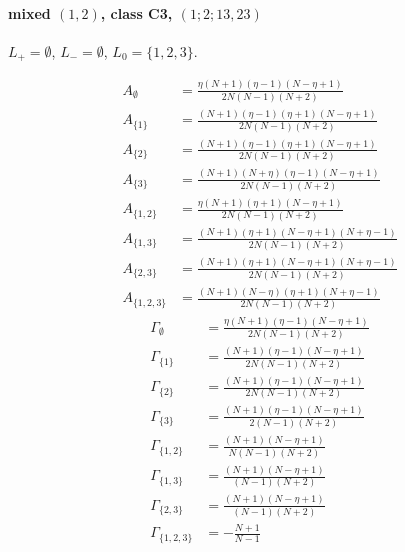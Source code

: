 \documentclass[11pt]{article}
\begin{document}
\paragraph{mixed $(1,2)$, class C3, $(1;2;13,23)$}

$L_+=\emptyset$, $L_-=\emptyset$, $L_0=\{1,2,3\}$.

\begin{align*}
  A_{\emptyset} &= \frac{\eta \left(N + 1\right) \left(\eta - 1\right) \left(N - \eta + 1\right)}{2 N \left(N - 1\right) \left(N + 2\right)} \\
  A_{\{1\}} &= \frac{\left(N + 1\right) \left(\eta - 1\right) \left(\eta + 1\right) \left(N - \eta + 1\right)}{2 N \left(N - 1\right) \left(N + 2\right)} \\
  A_{\{2\}} &= \frac{\left(N + 1\right) \left(\eta - 1\right) \left(\eta + 1\right) \left(N - \eta + 1\right)}{2 N \left(N - 1\right) \left(N + 2\right)} \\
  A_{\{3\}} &= \frac{\left(N + 1\right) \left(N + \eta\right) \left(\eta - 1\right) \left(N - \eta + 1\right)}{2 N \left(N - 1\right) \left(N + 2\right)} \\
  A_{\{1,2\}} &= \frac{\eta \left(N + 1\right) \left(\eta + 1\right) \left(N - \eta + 1\right)}{2 N \left(N - 1\right) \left(N + 2\right)} \\
  A_{\{1,3\}} &= \frac{\left(N + 1\right) \left(\eta + 1\right) \left(N - \eta + 1\right) \left(N + \eta - 1\right)}{2 N \left(N - 1\right) \left(N + 2\right)} \\
  A_{\{2,3\}} &= \frac{\left(N + 1\right) \left(\eta + 1\right) \left(N - \eta + 1\right) \left(N + \eta - 1\right)}{2 N \left(N - 1\right) \left(N + 2\right)} \\
  A_{\{1,2,3\}} &= \frac{\left(N + 1\right) \left(N - \eta\right) \left(\eta + 1\right) \left(N + \eta - 1\right)}{2 N \left(N - 1\right) \left(N + 2\right)} 
\end{align*}
\begin{align*}
  \Gamma_{\emptyset} &= \frac{\eta \left(N + 1\right) \left(\eta - 1\right) \left(N - \eta + 1\right)}{2 N \left(N - 1\right) \left(N + 2\right)} \\
  \Gamma_{\{1\}} &= \frac{\left(N + 1\right) \left(\eta - 1\right) \left(N - \eta + 1\right)}{2 N \left(N - 1\right) \left(N + 2\right)} \\
  \Gamma_{\{2\}} &= \frac{\left(N + 1\right) \left(\eta - 1\right) \left(N - \eta + 1\right)}{2 N \left(N - 1\right) \left(N + 2\right)} \\
  \Gamma_{\{3\}} &= \frac{\left(N + 1\right) \left(\eta - 1\right) \left(N - \eta + 1\right)}{2 \left(N - 1\right) \left(N + 2\right)} \\
  \Gamma_{\{1,2\}} &= \frac{\left(N + 1\right) \left(N - \eta + 1\right)}{N \left(N - 1\right) \left(N + 2\right)} \\
  \Gamma_{\{1,3\}} &= \frac{\left(N + 1\right) \left(N - \eta + 1\right)}{\left(N - 1\right) \left(N + 2\right)} \\
  \Gamma_{\{2,3\}} &= \frac{\left(N + 1\right) \left(N - \eta + 1\right)}{\left(N - 1\right) \left(N + 2\right)} \\
  \Gamma_{\{1,2,3\}} &= - \frac{N + 1}{N - 1} 
\end{align*}
\end{document}
